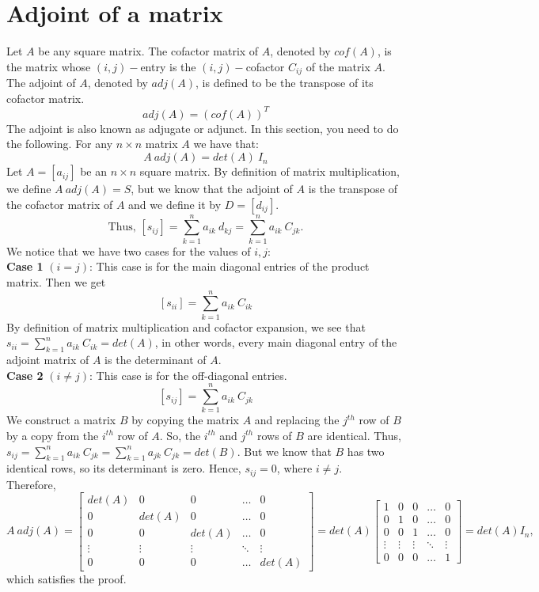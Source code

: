 \documentclass{article}
\begin{document}
\section{Adjoint of a matrix}
{Let $A$ be any square matrix. The cofactor matrix of $A$, denoted by $cof(A)$, is the matrix whose
$(i, j)-$entry is the $(i, j)-$cofactor $C_{ij}$ of the matrix $A$. The adjoint of $A$, denoted by $adj(A)$, is defined to
be the transpose of its cofactor matrix.
\[adj(A) = (cof(A))^T\]
The adjoint is also known as adjugate or adjunct. In this section, you need to do the following.}
\thmp{}{}
{
For any $n \times n$ matrix $A$ we have that: \[A\ adj(A)= det(A)\ I_n\]
}
{
Let $A=[a_{ij}]$ be an $n \times n$ square matrix. By definition of matrix multiplication, we define $A\ adj(A)=S$, but we know that the adjoint of $A$ is the transpose of the cofactor matrix of $A$ and we define it by $D=[d_{ij}]$. \[\text{Thus, }[s_{ij}]=\sum_{k=1}^na_{ik} \ d_{kj}=\sum_{k=1}^na_{ik} \ C_{jk}.\]
We notice that we have two cases for the values of $i,j$:\\

\textbf{Case 1} $(i=j)$: This case is for the main diagonal entries of the product matrix. Then we get \[[s_{ii}]=\sum_{k=1}^na_{ik} \ C_{ik}\]
By definition of matrix multiplication and cofactor expansion, we see that $s_{ii} =\sum_{k=1}^na_{ik} \ C_{ik}= det(A)$, in other words, every main diagonal entry of the adjoint matrix of $A$ is the determinant of $A$.\\

\textbf{Case 2} $(i\neq j)$: This case is for the off-diagonal entries.\[[s_{ij}]=\sum_{k=1}^na_{ik} \ C_{jk}\]
We construct a matrix $B$ by copying the matrix $A$ and replacing the $j^{th}$ row of $B$ by a copy from the $i^{th}$ row of $A$. So, the $i^{th}$ and $j^{th}$ rows of $B$ are identical. Thus, $s_{ij}=\sum_{k=1}^na_{ik} \ C_{jk}=\sum_{k=1}^na_{jk} \ C_{jk}=det(B).$ But we know that $B$ has two identical rows, so its determinant is zero. Hence, $s_{ij}=0$, where $i \neq j.$
\\
Therefore, \[A \ adj(A)= \begin{bmatrix}
    det(A)&0&0&\dots&0\\
    0&det(A)&0&\dots&0\\
    0&0&det(A)&\dots&0\\
    \vdots&\vdots&\vdots&\ddots&\vdots\\
    0&0&0&\dots&det(A)
\end{bmatrix} = det(A) \begin{bmatrix}
    1&0&0&\dots&0\\
    0&1&0&\dots&0\\
    0&0&1&\dots&0\\
    \vdots&\vdots&\vdots&\ddots&\vdots\\
    0&0&0&\dots&1
\end{bmatrix}=det(A)I_n, \]
which satisfies the proof.
} \newpage
\end{document}
